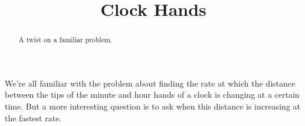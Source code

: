 \documentclass{ximera}
\title{Clock Hands}
\begin{document}
\begin{abstract}
A twist on a familiar problem.
\end{abstract}
\maketitle

We're all familiar with the problem about finding the rate at which the distance between the tips of the minute and hour hands of a clock is changing at a certain time. But a more interesting question is to ask when this distance is increasing at the fastest rate. 
\end{document}
